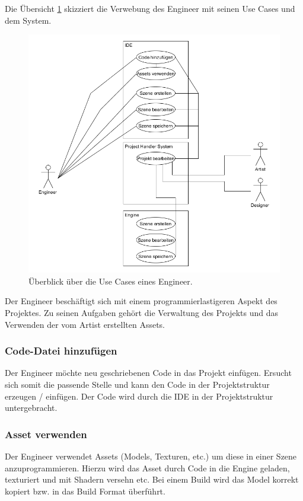 \documentclass[pagesize, paper=a4, fontsize=12pt, titlepage=true, headings=small, headnosepline, abstractoff, liststotoc, nochapterprefix, plainheadsepline, twoside]{scrreprt}
\begin{document}
Die Übersicht \ref{UseCaseEngineer} skizziert die Verwebung des Engineer mit seinen Use Cases und dem System.
\begin{figure}[ht]
	\centering
	\includegraphics[width=\linewidth]{Bilder/UseCase_Engineer.png}
	\caption{Überblick über die Use Cases eines Engineer.}
	\label{UseCaseEngineer}
\end{figure}

Der Engineer beschäftigt sich mit einem programmierlastigeren Aspekt des Projektes. Zu seinen Aufgaben gehört die Verwaltung des Projekts und das Verwenden der vom Artist erstellten Assets.

\subsubsection{Code-Datei hinzufügen}
Der Engineer möchte neu geschriebenen Code in das Projekt einfügen. Ersucht sich somit die passende Stelle und kann den Code in der Projektstruktur erzeugen / einfügen. Der Code wird durch die IDE in der Projektstruktur untergebracht.

\subsubsection{Asset verwenden}
Der Engineer verwendet Assets (Models, Texturen, etc.) um diese in einer Szene anzuprogrammieren. Hierzu wird das Asset durch Code in die Engine geladen, texturiert und mit Shadern versehn etc. Bei einem Build wird das Model korrekt kopiert bzw. in das Build Format überführt.
\end{document}
